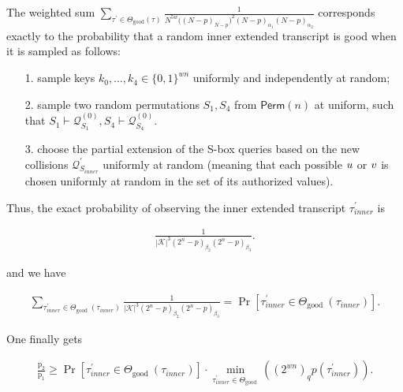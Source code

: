 The weighted sum $\sum_{\tau^{\prime} \in \Theta_{\mathrm{good}}(\tau)}
\frac{1}{N^{5w}\big((N-p)_{N-p}\big)^2(N-p)_{\alpha_1}(N-p)_{\alpha_2}}$ corresponds exactly to the probability that a random inner extended transcript is good when it is sampled as follows:

\begin{itemize}
	\item[1.] sample keys $k_0,\ldots,k_4\in\{0,1\}^{wn}$ uniformly and independently at random;
	\item[2.] sample two random permutations $S_1,S_4$ from $\mathsf{Perm}(n)$ at uniform, such that $S_1\vdash\mathcal{Q}_{S_1}^{(0)},S_4\vdash\mathcal{Q}_{S_4}^{(0)}$.
	\item[3.] choose the partial extension of the S-box queries based on the new collisions $\mathcal{Q}_{S_{inner}}^{\prime}$ uniformly at random (meaning that each possible $\mathnormal{u}$ or $\mathnormal{v}$ is chosen uniformly at random in the set of its authorized values).
\end{itemize}

Thus, the exact probability of observing the inner extended transcript $\tau_{inner}^{\prime}$ is

$$
\begin{aligned}
\frac{1}{|\mathcal{K}|^{3}\left(2^{n}-p\right)_{\beta_{2}}\left(2^{n}-p\right)_{\beta_{3}}}.
\end{aligned}
$$

and we have

$$
\begin{aligned}
\sum_{\tau_{inner}^{\prime} \in \Theta_{\text {good }}(\tau_{inner})} \frac{1}{|\mathcal{K}|^{3}\left(2^{n}-p\right)_{\beta_{2}}\left(2^{n}-p\right)_{\beta_{3}}} = \operatorname{Pr}\left[ \tau_{inner}^{\prime} \in \Theta_{\text {good }}(\tau_{inner})\right].
\end{aligned}
$$

One finally gets

\begin{equation}
\begin{aligned}
\frac{\mathrm{p}_{2}}{\mathrm{p}_{1}} \geq \operatorname{Pr}\left[ \tau_{inner}^{\prime} \in \Theta_{\text {good }}(\tau_{inner})\right] \cdot \min _{\tau_{inner}^{\prime} \in \Theta_{\text {good }}}((2^{w n})_{q} p(\tau_{inner}^{\prime})).
\end{aligned}
\end{equation}








